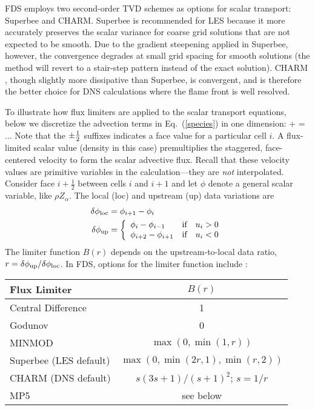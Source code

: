 FDS employs two second-order TVD schemes as options for scalar transport: Superbee and CHARM.  Superbee \cite{Roe:1986} is recommended for LES because it more accurately preserves the scalar variance for coarse grid solutions that are not expected to be smooth.  Due to the gradient steepening applied in Superbee, however, the convergence degrades at small grid spacing for smooth solutions (the method will revert to a stair-step pattern instead of the exact solution).  CHARM \cite{Zhou:1995}, though slightly more dissipative than Superbee, is convergent, and is therefore the better choice for DNS calculations where the flame front is well resolved.

To illustrate how flux limiters are applied to the scalar transport equations, below we discretize the advection terms in Eq.~(\ref{species}) in one dimension:
\be  {}
    +  = ...
\ee
Note that the $\pm\frac{1}{2}$ suffixes indicates a face value for a particular cell $i$. A flux-limited scalar value (density in this case) premultiplies the staggered, face-centered velocity to form the scalar advective flux.  Recall that these velocity values are primitive variables in the calculation---they are \emph{not} interpolated.
Consider face $i+\frac{1}{2}$ between cells $i$ and $i+1$ and let $\phi$ denote a general scalar variable, like $\rho Z_\alpha$.  The local (loc) and upstream (up) data variations are
\begin{align}
\delta \phi_{\rm loc} &= \phi_{i+1}-\phi_i \\
\delta \phi_{\rm up}  &= \left\{ \begin{array}{ll} \phi_i-\phi_{i-1} & \mbox{if} \quad u_i>0 \\ \phi_{i+2}-\phi_{i+1} & \mbox{if} \quad u_i<0 \end{array} \right.
\end{align}
The limiter function $B(r)$ depends on the upstream-to-local data ratio, $r=\delta \phi_{\rm up}/\delta \phi_{\rm loc}$. In FDS, options for the limiter function include \cite{Toro}:
\begin{table}[H]
\begin{center}
\begin{tabular}{lc}
Flux Limiter                           & $B(r)$                         \\
\hline
Central Difference                     & 1                              \\
Godunov                                & 0                              \\
MINMOD                                 & $\max(0,\min(1,r))$            \\
Superbee \cite{Roe:1986} (LES default) & $\max(0,\min(2r,1),\min(r,2))$ \\
CHARM \cite{Zhou:1995} (DNS default)   & $s(3s+1)/(s+1)^2$; $s=1/r$     \\
MP5 \cite{Suresh:1997}                 & see below
\end{tabular}
\end{center}
\end{table}
